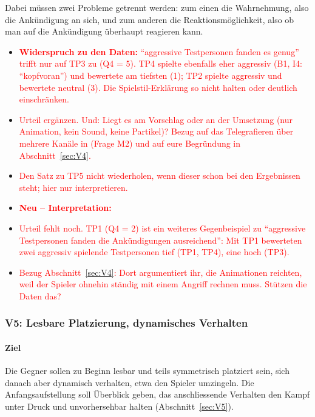 \documentclass[../Main.tex]{subfiles}
\begin{document}
Dabei müssen zwei Probleme getrennt werden: zum einen die Wahrnehmung, also die Ankündigung an sich, und zum anderen die Reaktionsmöglichkeit, also ob man auf die Ankündigung überhaupt reagieren kann.

\begin{itemize}[leftmargin=1.5cm]
    \item \textcolor{red}{\textbf{Widerspruch zu den Daten:} \enquote{aggressive Testpersonen fanden es genug} trifft nur auf TP3 zu (Q4 = 5). TP4 spielte ebenfalls eher aggressiv (B1, I4: \enquote{kopfvoran}) und bewertete am tiefsten (1); TP2 spielte aggressiv und bewertete neutral (3). Die Spielstil-Erklärung so nicht halten oder deutlich einschränken.}
    \item \textcolor{red}{Urteil ergänzen. Und: Liegt es am Vorschlag oder an der Umsetzung (nur Animation, kein Sound, keine Partikel)? Bezug auf das Telegrafieren über mehrere Kanäle in  (Frage M2) und auf eure Begründung in Abschnitt~\ref{sec:V4}.}
    \item \textcolor{red}{Den Satz zu TP5 nicht wiederholen, wenn dieser schon bei den Ergebnissen steht; hier nur interpretieren.}
\end{itemize}

\begin{itemize}[leftmargin=1.5cm]
    \item \textcolor{red}{\textbf{Neu -- Interpretation:}}
    \item \textcolor{red}{Urteil fehlt noch. TP1 (Q4 = 2) ist ein weiteres Gegenbeispiel zu \enquote{aggressive Testpersonen fanden die Ankündigungen ausreichend}: Mit TP1 bewerteten zwei aggressiv spielende Testpersonen tief (TP1, TP4), eine hoch (TP3).}
    \item \textcolor{red}{Bezug Abschnitt~\ref{sec:V4}: Dort argumentiert ihr, die Animationen reichten, weil der Spieler ohnehin ständig mit einem Angriff rechnen muss. Stützen die Daten das?}
\end{itemize}

\subsubsection{V5: Lesbare Platzierung, dynamisches Verhalten}

\paragraph{Ziel}
Die Gegner sollen zu Beginn lesbar und teils symmetrisch platziert sein, sich danach aber dynamisch verhalten, etwa den Spieler umzingeln. Die Anfangsaufstellung soll Überblick geben, das anschliessende Verhalten den Kampf unter Druck und unvorhersehbar halten (Abschnitt~\ref{sec:V5}).
\end{document}

